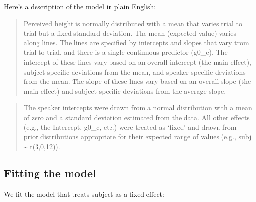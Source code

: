 \documentclass[
]{book}
\begin{document}
Here's a description of the model in plain English:

\begin{quote}
Perceived height is normally distributed with a mean that varies trial to trial but a fixed standard deviation. The mean (expected value) varies along lines. The lines are specified by intercepts and slopes that vary trom trial to trial, and there is a single continuous predictor (g0\_c). The intercept of these lines vary based on an overall intercept (the main effect), subject-specific deviations from the mean, and speaker-specific deviations from the mean. The slope of these lines vary based on an overall slope (the main effect) and subject-specific deviations from the average slope.
\end{quote}

\begin{quote}
The speaker intercepts were drawn from a normal distribution with a mean of zero and a standard deviation estimated from the data. All other effects (e.g., the Intercept, g0\_c, etc.) were treated as `fixed' and drawn from prior distributions appropriate for their expected range of values (e.g., subj \textasciitilde{} t(3,0,12)).
\end{quote}

\hypertarget{fitting-the-model-6}{%
\subsection{Fitting the model}\label{fitting-the-model-6}}

We fit the model that treats subject as a fixed effect:
\end{document}
